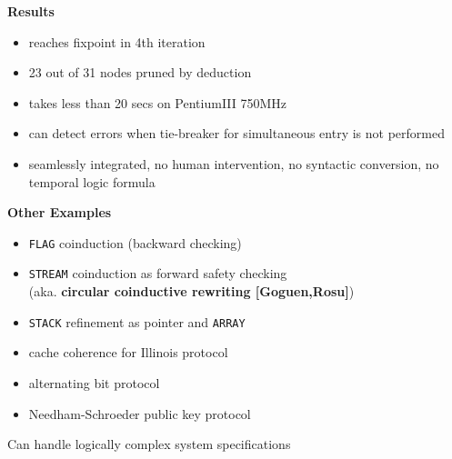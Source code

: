 \documentclass[landscape]{slides}
\begin{document}
\begin{slide}\large\parskip=0pt
  \textbf{Results}

  \bigskip\bigskip

  \begin{itemize}\itemsep=0pt
  \item reaches fixpoint in 4th iteration
  \item 23 out of 31 nodes pruned by deduction
  \item takes less than 20 secs on PentiumIII 750MHz
  \item can detect errors when tie-breaker for simultaneous entry is
    not performed
  \item seamlessly integrated, no human intervention, no syntactic
    conversion, no temporal logic formula
  \end{itemize}
\end{slide}

\begin{slide}\large\parskip=0pt

\hspace*{-2cm}\textheight{}

\end{slide}

\begin{slide}\large\parskip=0pt
  \textbf{Other Examples}

  \begin{itemize}\itemsep=0pt
  \item \texttt{FLAG} coinduction (backward checking)
  \item \texttt{STREAM} coinduction as forward safety checking\\
    (aka. {\normalsize\textbf{circular coinductive rewriting
        [Goguen,Rosu]}})
  \item \texttt{STACK} refinement as pointer and \texttt{ARRAY}
  \item cache coherence for Illinois protocol
  \item alternating bit protocol
  \item Needham-Schroeder public key protocol
  \end{itemize}

  \bigskip\bigskip

  Can handle logically complex system specifications
\end{slide}
\end{document}
